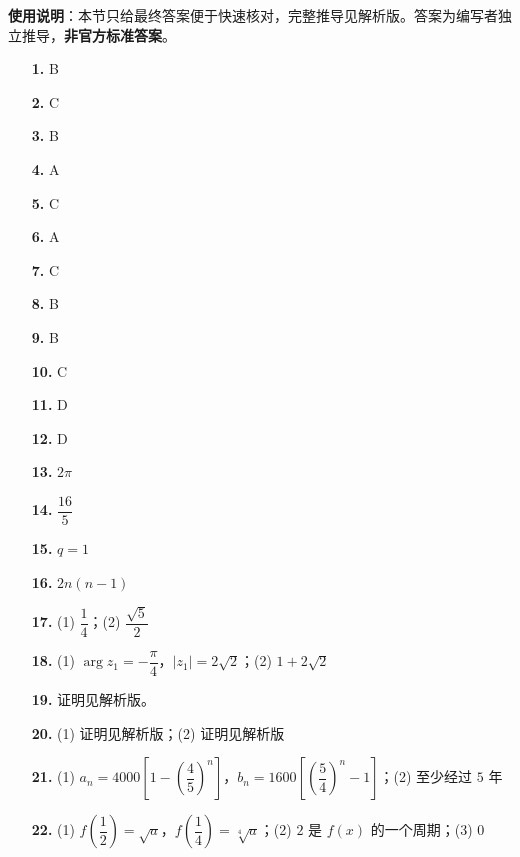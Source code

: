 
\begin{gknotice}
\textbf{使用说明}：本节只给最终答案便于快速核对，完整推导见解析版。答案为编写者独立推导，\textbf{非官方标准答案}。
\end{gknotice}

\begin{itemize}[leftmargin=2.6em]
  \item[\textbf{1.}] B
  \item[\textbf{2.}] C
  \item[\textbf{3.}] B
  \item[\textbf{4.}] A
  \item[\textbf{5.}] C
  \item[\textbf{6.}] A
  \item[\textbf{7.}] C
  \item[\textbf{8.}] B
  \item[\textbf{9.}] B
  \item[\textbf{10.}] C
  \item[\textbf{11.}] D
  \item[\textbf{12.}] D
  \item[\textbf{13.}] $2\pi$
  \item[\textbf{14.}] $\dfrac{16}{5}$
  \item[\textbf{15.}] $q=1$
  \item[\textbf{16.}] $2n(n-1)$
  \item[\textbf{17.}] (1) $\dfrac14$；(2) $\dfrac{\sqrt5}{2}$
  \item[\textbf{18.}] (1) $\arg z_1=-\dfrac\pi4$，$|z_1|=2\sqrt2$；(2) $1+2\sqrt2$
  \item[\textbf{19.}] 证明见解析版。
  \item[\textbf{20.}] (1) 证明见解析版；(2) 证明见解析版
  \item[\textbf{21.}] (1) $a_n=4000\left[1-\left(\dfrac45\right)^n\right]$，$b_n=1600\left[\left(\dfrac54\right)^n-1\right]$；(2) 至少经过 $5$ 年
  \item[\textbf{22.}] (1) $f\left(\dfrac12\right)=\sqrt a$，$f\left(\dfrac14\right)=\sqrt[4]{a}$；(2) $2$ 是 $f(x)$ 的一个周期；(3) $0$
\end{itemize}
